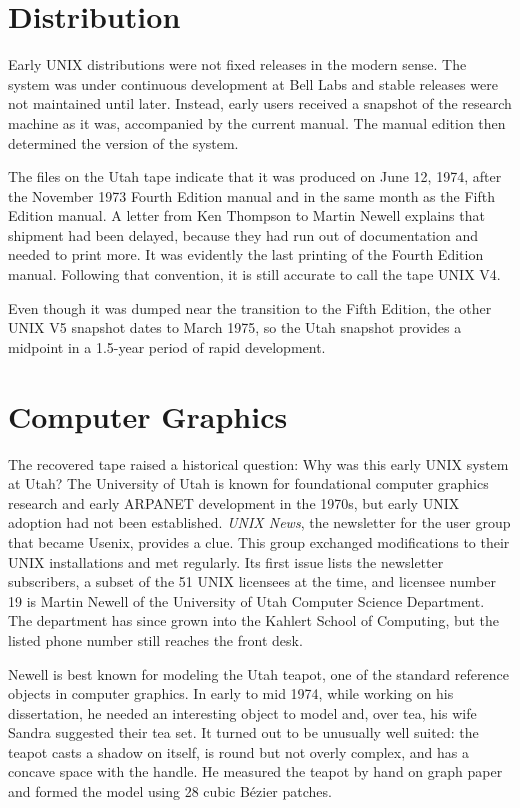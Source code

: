 \section{Distribution}

Early UNIX distributions were not fixed releases in the modern sense.
The system was under continuous development at Bell Labs and stable releases were not maintained until later.
Instead, early users received a snapshot of the research machine as it was, accompanied by the current manual.
The manual edition then determined the version of the system.

The files on the Utah tape indicate that it was produced on June 12, 1974, after the November 1973 Fourth Edition manual and in the same month as the Fifth Edition manual.
A letter from Ken Thompson to Martin Newell explains that shipment had been delayed, because they had run out of documentation and needed to print more.
It was evidently the last printing of the Fourth Edition manual.
Following that convention, it is still accurate to call the tape UNIX V4.

Even though it was dumped near the transition to the Fifth Edition, the other UNIX V5 snapshot dates to March 1975, so the Utah snapshot provides a midpoint in a 1.5-year period of rapid development.

\section{Computer Graphics}

The recovered tape raised a historical question: Why was this early UNIX system at Utah?
The University of Utah is known for foundational computer graphics research and early ARPANET development in the 1970s, but early UNIX adoption had not been established.
\textit{UNIX News}, the newsletter for the user group that became Usenix, provides a clue.
This group exchanged modifications to their UNIX installations and met regularly.
Its first issue lists the newsletter subscribers, a subset of the 51 UNIX licensees at the time, and licensee number 19 is Martin Newell of the University of Utah Computer Science Department.
The department has since grown into the Kahlert School of Computing, but the listed phone number still reaches the front desk.

Newell is best known for modeling the Utah teapot, one of the standard reference objects in computer graphics.
In early to mid 1974, while working on his dissertation, he needed an interesting object to model and, over tea, his wife Sandra suggested their tea set.
It turned out to be unusually well suited: the teapot casts a shadow on itself, is round but not overly complex, and has a concave space with the handle.
He measured the teapot by hand on graph paper and formed the model using 28 cubic Bézier patches.

